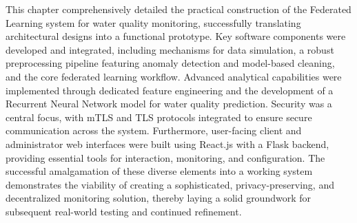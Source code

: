 This chapter comprehensively detailed the practical construction of the Federated Learning system for water quality monitoring, successfully translating architectural designs into a functional prototype. Key software components were developed and integrated, including mechanisms for data simulation, a robust preprocessing pipeline featuring anomaly detection and model-based cleaning, and the core federated learning workflow. Advanced analytical capabilities were implemented through dedicated feature engineering and the development of a Recurrent Neural Network model for water quality prediction. Security was a central focus, with mTLS and TLS protocols integrated to ensure secure communication across the system. Furthermore, user-facing client and administrator web interfaces were built using React.js with a Flask backend, providing essential tools for interaction, monitoring, and configuration. The successful amalgamation of these diverse elements into a working system demonstrates the viability of creating a sophisticated, privacy-preserving, and decentralized monitoring solution, thereby laying a solid groundwork for subsequent real-world testing and continued refinement.

\pagebreak